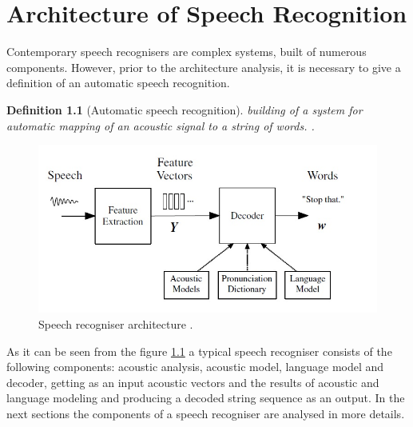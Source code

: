 \documentclass[11pt,a4paper]{report}
\newtheorem{definition}[theorem]{Definition}
\begin{document}
\chapter {Architecture of Speech Recognition}
\label {sec:architecture}

Contemporary speech recognisers are complex systems, built of
numerous components. However, prior to the architecture analysis, it is necessary to give
a definition of an automatic speech recognition. \begin {definition}[Automatic speech recognition] building of a
system for automatic mapping of an acoustic signal to a string of words. \citep
{jurafsky-martin-2009}.
\end{definition}
\begin  {figure}[h]
\begin {center}
     \includegraphics[height=6.0 cm]{arc2}
     \caption {Speech recogniser architecture \citep {Gales2008application}.}
     \label {fig:arc}
     \end {center}
     \end {figure}

As it can be seen from the figure \ref{fig:arc} a typical
speech recogniser consists of the following components: acoustic analysis, acoustic model,
language model and decoder, getting as an input acoustic vectors and the results
of acoustic and language modeling and producing a decoded string sequence as
an output.  In the next sections the components of a speech recogniser are
analysed in more details. 
\end{document}

